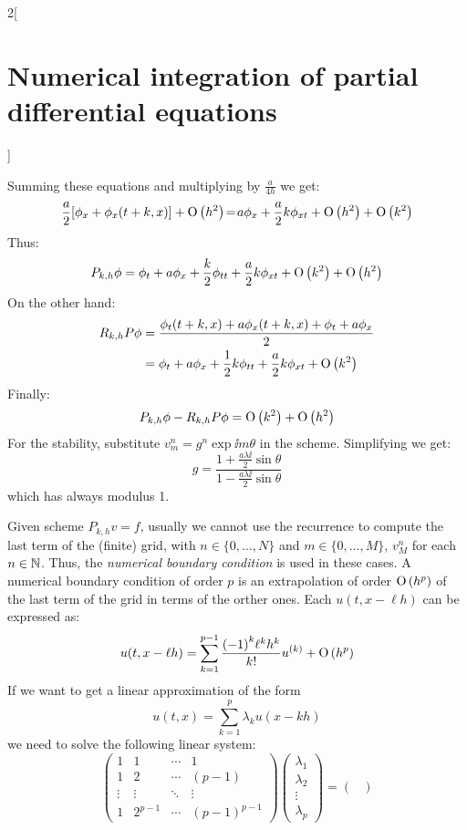\documentclass[../../../main_math.tex]{subfiles}
\begin{document}
\begin{multicols}{2}[\section{Numerical integration of partial differential equations}]
\begin{sproof}
    Summing these equations and multiplying by $\frac{a}{4h}$ we get:
    $$
      \frac{a}{2}[\phi_x+\phi_x(t+k,x)]+\O{h^2}\!=\!a\phi_x+\frac{a}{2}k\phi_{xt}+\O{h^2}+\O{k^2}
    $$
    Thus:
    $$
      P_{k,h}\phi=\phi_t+a\phi_x+\frac{k}{2}\phi_{tt}+\frac{a}{2}k\phi_{xt}+\O{k^2}+\O{h^2}
    $$
    On the other hand:
    \begin{align*}
      R_{k,h}P\phi & =\frac{\phi_t(t+k,x)+a\phi_x(t+k,x)+\phi_t+a\phi_x}{2}              \\
                   & =\phi_t+a\phi_x+\frac{1}{2}k\phi_{tt}+\frac{a}{2}k\phi_{xt}+\mathrm{O}\left(k^2\right)
    \end{align*}
    Finally:
    $$
      P_{k,h}\phi-R_{k,h}P\phi=\O{k^2}+\O{h^2}
    $$
    For the stability, substitute $v_m^n=g^n\exp{\ii m\theta}$ in the scheme. Simplifying we get:
    $$
      g=\frac{1+\frac{a\lambda\ii}{2}\sin\theta}{1-\frac{a\lambda\ii}{2}\sin\theta}
    $$
    which has always modulus 1.
  \end{sproof}
  \begin{definition}
    Given scheme $P_{k,h}{v}={f}$, usually we cannot use the recurrence to compute the last term of the (finite) grid, with $n\in\{0,\ldots,N\}$ and $m\in\{0,\ldots,M\}$, $v_M^{n}$ for each $n\in\NN$. Thus, the \emph{numerical boundary condition} is used in these cases. A numerical boundary condition of order $p$ is an extrapolation of order $\O{h^p}$ of the last term of the grid in terms of the orther ones. Each $u(t,x-\ell h)$ can be expressed as: $$u(t,x-\ell h)=\sum_{k=1}^{p-1}\frac{{(-1)}^k \ell^kh^k}{k!}u^{(k)}+\O{h^p}$$
    If we want to get a linear approximation of the form
    $$u(t,x)=\sum_{k=1}^{p}\lambda_ku(x-kh)$$
    we need to solve the following linear system:
    $$
      \begin{pmatrix}
        1      & 1       & \cdots & 1             \\
        1      & 2       & \cdots & {(p-1)}       \\
        \vdots & \vdots  & \ddots & \vdots        \\
        1      & 2^{p-1} & \cdots & {(p-1)}^{p-1}
      \end{pmatrix}
      \begin{pmatrix}
        \lambda_1 \\
        \lambda_2 \\
        \vdots    \\
        \lambda_p
      \end{pmatrix}=
      \begin{pmatrix}

\end{pmatrix}$$
\end{definition}
\end{multicols}
\end{document}
